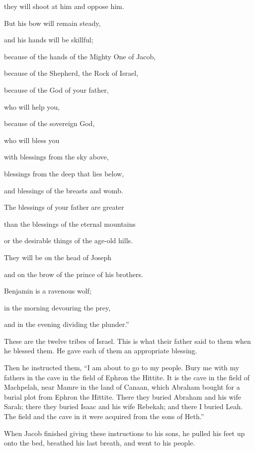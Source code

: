 {\par }{\Q they will shoot
at him and oppose him.
\par }{\Q {}But his bow
will remain
steady,
\par }{\Q and his hands
will be skillful;
\par }{\Q because of the hands
of the Mighty One
of Jacob,
\par }{\Q because
of the Shepherd,
the Rock
of Israel,
\par }{\Q {}because of the God
of your father,
\par }{\Q who will help
you,

\par }{\Q because of the sovereign
God,

\par }{\Q who will bless
you

\par }{\Q with blessings
from the sky
above,
\par }{\Q blessings
from the deep
that lies
below,
\par }{\Q and blessings
of the breasts
and womb.
\par }{\Q {}The blessings
of your father
are greater
\par }{\Q than
the blessings
of the eternal
mountains
\par }{\Q or the desirable things
of the age-old
hills.
\par }{\Q They will be
on the head
of Joseph
\par }{\Q and on the brow
of the prince
of his brothers.
\par }{\Q {}Benjamin
is a ravenous
wolf;
\par }{\Q in the morning
devouring
the prey,
\par }{\Q and in the evening
dividing
the plunder.”
\par }{\PP {}These
are the twelve
tribes
of Israel.
This
is what
their father
said
to them when he blessed
them. He gave each
of them an appropriate
blessing.
\par }{\PP {}Then he instructed
them, “I
am about to
go
to my people.
Bury
me with
my fathers
in
the cave
in the field
of Ephron
the Hittite.
It is the cave
in the field
of Machpelah,
near
Mamre
in the land
of Canaan,
which
Abraham
bought
for a burial
plot
from Ephron
the Hittite.
There
they buried
Abraham
and his wife
Sarah;
there
they buried
Isaac
and his wife
Rebekah;
and there
I buried
Leah.
The field
and the cave
in it were acquired
from the sons
of Heth.”
\par }{\PP {}When Jacob
finished
giving these instructions
to his sons,
he pulled
his feet
up onto
the bed,
breathed
his last breath,
and went
to
his people.

}
